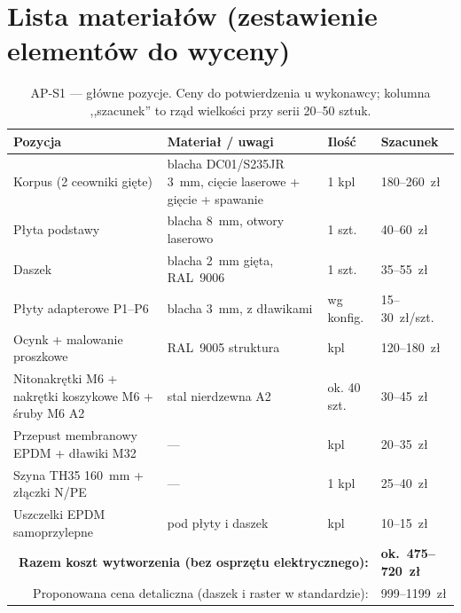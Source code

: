 \documentclass[11pt,a4paper]{article}
\begin{document}
\clearpage
\section{Lista materiałów (zestawienie elementów do wyceny)}
\begin{table}[h]\small
\caption{AP-S1 --- główne pozycje. Ceny do potwierdzenia u wykonawcy; kolumna ,,szacunek'' to rząd
wielkości przy serii 20--50 sztuk.}
\begin{tabular}{p{6.2cm}p{4.6cm}p{2.2cm}p{2.2cm}}
\toprule
Pozycja & Materiał / uwagi & Ilość & Szacunek\\
\midrule
Korpus (2 ceowniki gięte) & blacha DC01/S235JR 3~mm, cięcie laserowe + gięcie + spawanie & 1 kpl & 180--260~zł\\
Płyta podstawy & blacha 8~mm, otwory laserowo & 1 szt. & 40--60~zł\\
Daszek & blacha 2~mm gięta, RAL~9006 & 1 szt. & 35--55~zł\\
Płyty adapterowe P1--P6 & blacha 3~mm, z dławikami & wg konfig. & 15--30~zł/szt.\\
Ocynk + malowanie proszkowe & RAL~9005 struktura & kpl & 120--180~zł\\
Nitonakrętki M6 + nakrętki koszykowe M6 + śruby M6 A2 & stal nierdzewna A2 & ok. 40 szt. & 30--45~zł\\
Przepust membranowy EPDM + dławiki M32 & --- & kpl & 20--35~zł\\
Szyna TH35 160~mm + złączki N/PE & --- & 1 kpl & 25--40~zł\\
Uszczelki EPDM samoprzylepne & pod płyty i daszek & kpl & 10--15~zł\\
\midrule
\multicolumn{3}{r}{\textbf{Razem koszt wytworzenia (bez osprzętu elektrycznego):}} & \textbf{ok.~475--720~zł}\\
\multicolumn{3}{r}{Proponowana cena detaliczna (daszek i raster w standardzie):} & 999--1199~zł\\
\bottomrule
\end{tabular}
\end{table}
\end{document}
